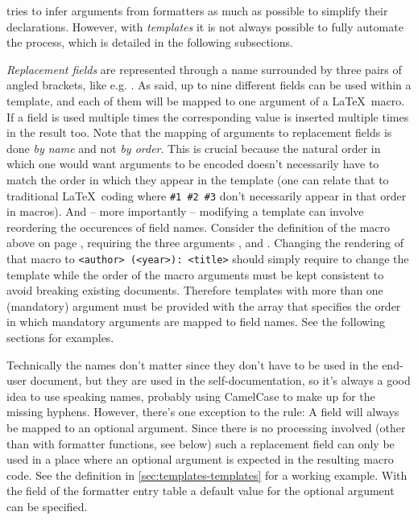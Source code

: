 \documentclass{scrartcl}
\begin{document}
 tries to infer arguments from formatters as much as
possible to simplify their declarations.  However, with \emph{templates} it is
not always possible to fully automate the process, which is detailed in the
following subsections.

\emph{Replacement fields} are represented through a name surrounded by three
pairs of angled brackets, like e.g. .  As said, up to nine
different fields can be used within a template, and each of them will be mapped
to one argument of a \LaTeX\ macro.  If a field is used multiple times the
corresponding value is inserted multiple times in the result too. Note that the
mapping of arguments to replacement fields is done \emph{by name} and not
\emph{by order}.  This is crucial because the natural order in which one would
want arguments to be encoded doesn't necessarily have to match the order in
which they appear in the template (one can relate that to traditional \LaTeX\
coding where \texttt{\#1 \#2 \#3} don't necessarily appear in that order in
macros). And -- more importantly -- modifying a template can involve reordering
the occurences of field names. Consider the definition of the \cmd{bookShort}
macro above on page \pageref{code:bookShort}, requiring the three arguments
\luavar{author}, \luavar{title} and \luavar{year}.  Changing the rendering of
that macro to \texttt{<author> (<year>): <title>} should simply require to
change the template while the order of the macro arguments must be kept
consistent to avoid breaking existing documents.  Therefore templates with more
than one (mandatory) argument must be provided with the \luavar{args} array that
specifies the order in which mandatory arguments are mapped to field names.  See
the following sections for examples.

Technically the names don't matter since they don't have to be used in the
end-user document, but they are used in the self-documentation, so it's always a
good idea to use speaking names, probably using CamelCase to make up for the
missing hyphens.  However, there's one exception to the rule: A field
\luavar{<<<options>>>} will always be mapped to an optional argument.  Since
there is no processing involved (other than with formatter functions, see below)
such a replacement field can only be used in a place where an optional argument
is expected in the resulting macro code.  See the \cmd{image} definition in
\vref{sec:templates-templates} for a working example.  With the \luavar{opt}
field of the formatter entry table a default value for the optional argument can
be specified.
\end{document}
